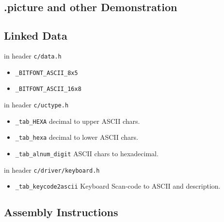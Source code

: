 \subsection{.picture and other Demonstration}

\subsection{Linked Data}

in header \verb`c/data.h`
\begin{itemize}
	\item \verb `_BITFONT_ASCII_8x5`
	\item \verb `_BITFONT_ASCII_16x8`
\end{itemize}

in header \verb`c/uctype.h`
\begin{itemize}
	\item \verb `_tab_HEXA` decimal to upper ASCII chars.
	\item \verb `_tab_hexa` decimal to lower ASCII chars.
	\item \verb `_tab_alnum_digit` ASCII chars to hexadecimal.
\end{itemize}

in header \verb`c/driver/keyboard.h`
\begin{itemize}
	\item \verb `_tab_keycode2ascii` Keyboard Scan-code to ASCII and description.
\end{itemize}

\subsection{Assembly Instructions}


